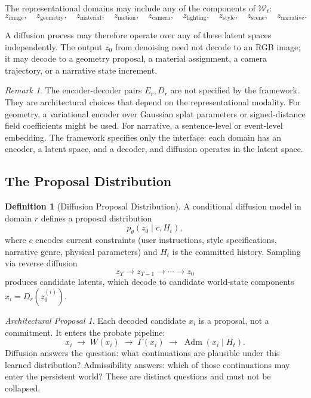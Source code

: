 \documentclass[11pt,a4paper]{article}
\theoremstyle{plain}
\theoremstyle{definition}
\newtheorem{definition}[theorem]{Definition}
\theoremstyle{remark}
\newtheorem{remark}[theorem]{Remark}
\newtheorem{proposal}[theorem]{Architectural Proposal}
\DeclareMathOperator{\Adm}{Adm}
\begin{document}
The representational domains may include any of the components of $\mathcal{W}_t$:
\[
z_{\mathrm{image}}, \quad
z_{\mathrm{geometry}}, \quad
z_{\mathrm{material}}, \quad
z_{\mathrm{motion}}, \quad
z_{\mathrm{camera}}, \quad
z_{\mathrm{lighting}}, \quad
z_{\mathrm{style}}, \quad
z_{\mathrm{scene}}, \quad
z_{\mathrm{narrative}}.
\]

A diffusion process may therefore operate over any of these latent spaces independently. The output $z_0$ from denoising need not decode to an RGB image; it may decode to a geometry proposal, a material assignment, a camera trajectory, or a narrative state increment.

\begin{remark}
The encoder-decoder pairs $E_r, D_r$ are not specified by the framework. They are architectural choices that depend on the representational modality. For geometry, a variational encoder over Gaussian splat parameters or signed-distance field coefficients might be used. For narrative, a sentence-level or event-level embedding. The framework specifies only the interface: each domain has an encoder, a latent space, and a decoder, and diffusion operates in the latent space.
\end{remark}

\subsection{The Proposal Distribution}

\begin{definition}[Diffusion Proposal Distribution]
A conditional diffusion model in domain $r$ defines a proposal distribution
\[
p_\theta(z_0 \mid c, H_t),
\]
where $c$ encodes current constraints (user instructions, style specifications, narrative genre, physical parameters) and $H_t$ is the committed history. Sampling via reverse diffusion
\[
z_T \to z_{T-1} \to \cdots \to z_0
\]
produces candidate latents, which decode to candidate world-state components $x_i = D_r(z_0^{(i)})$.
\end{definition}

\begin{proposal}
\label{prop:diffusion-proposal}
Each decoded candidate $x_i$ is a proposal, not a commitment. It enters the probate pipeline:
\[
x_i \;\to\; W(x_i) \;\to\; \Gamma(x_i) \;\to\; \Adm(x_i \mid H_t).
\]
Diffusion answers the question: what continuations are plausible under this learned distribution? Admissibility answers: which of those continuations may enter the persistent world? These are distinct questions and must not be collapsed.
\end{proposal}
\end{document}
